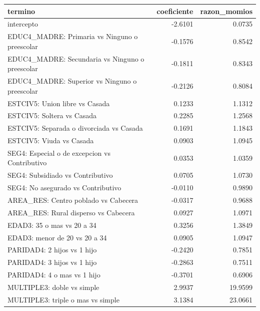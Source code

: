 \begin{tabular}{lrr}
\toprule
termino & coeficiente & razon\_momios \\
\midrule
intercepto & -2.6101 & 0.0735 \\
EDUC4\_MADRE: Primaria vs Ninguno o preescolar & -0.1576 & 0.8542 \\
EDUC4\_MADRE: Secundaria vs Ninguno o preescolar & -0.1811 & 0.8343 \\
EDUC4\_MADRE: Superior vs Ninguno o preescolar & -0.2126 & 0.8084 \\
ESTCIV5: Union libre vs Casada & 0.1233 & 1.1312 \\
ESTCIV5: Soltera vs Casada & 0.2285 & 1.2568 \\
ESTCIV5: Separada o divorciada vs Casada & 0.1691 & 1.1843 \\
ESTCIV5: Viuda vs Casada & 0.0903 & 1.0945 \\
SEG4: Especial o de excepcion vs Contributivo & 0.0353 & 1.0359 \\
SEG4: Subsidiado vs Contributivo & 0.0705 & 1.0730 \\
SEG4: No asegurado vs Contributivo & -0.0110 & 0.9890 \\
AREA\_RES: Centro poblado vs Cabecera & -0.0317 & 0.9688 \\
AREA\_RES: Rural disperso vs Cabecera & 0.0927 & 1.0971 \\
EDAD3: 35 o mas vs 20 a 34 & 0.3256 & 1.3849 \\
EDAD3: menor de 20 vs 20 a 34 & 0.0905 & 1.0947 \\
PARIDAD4: 2 hijos vs 1 hijo & -0.2420 & 0.7851 \\
PARIDAD4: 3 hijos vs 1 hijo & -0.2863 & 0.7511 \\
PARIDAD4: 4 o mas vs 1 hijo & -0.3701 & 0.6906 \\
MULTIPLE3: doble vs simple & 2.9937 & 19.9599 \\
MULTIPLE3: triple o mas vs simple & 3.1384 & 23.0661 \\
\bottomrule
\end{tabular}
